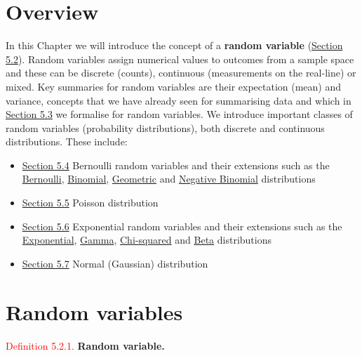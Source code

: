\documentclass[
]{book}
\providecommand{\tightlist}{%
  \setlength{\itemsep}{0pt}\setlength{\parskip}{0pt}}
\begin{document}
\hypertarget{rv:overview}{%
\section{Overview}\label{rv:overview}}

In this Chapter we will introduce the concept of a \textbf{random variable} (\protect\hyperlink{rv:des}{Section 5.2}). Random variables assign numerical values to outcomes from a sample space and these can be discrete (counts), continuous (measurements on the real-line) or mixed. Key summaries for random variables are their expectation (mean) and variance, concepts that we have already seen for summarising data and which in \protect\hyperlink{rv:expect}{Section 5.3} we formalise for random variables. We introduce important classes of random variables (probability distributions), both discrete and continuous distributions. These include:

\begin{itemize}
\tightlist
\item
  \protect\hyperlink{rv:Bernoulli}{Section 5.4} Bernoulli random variables and their extensions such as the \protect\hyperlink{rv:Bernoulli:bern}{Bernoulli}, \protect\hyperlink{rv:Bernoulli:bin}{Binomial}, \protect\hyperlink{rv:Bernoulli:geom}{Geometric} and \protect\hyperlink{rv:Bernoulli:negbin}{Negative Binomial} distributions\\
\item
  \protect\hyperlink{rv:Poisson}{Section 5.5} Poisson distribution\\
\item
  \protect\hyperlink{rv:exponential}{Section 5.6} Exponential random variables and their extensions such as the \protect\hyperlink{rv:exponential:exp}{Exponential}, \protect\hyperlink{rv:exponential:gamma}{Gamma}, \protect\hyperlink{rv:exponential:chi}{Chi-squared} and \protect\hyperlink{rv:exponential:beta}{Beta} distributions\\
\item
  \protect\hyperlink{rv:normal}{Section 5.7} Normal (Gaussian) distribution
\end{itemize}

\hypertarget{rv:des}{%
\section{Random variables}\label{rv:des}}

\leavevmode{}%
\textcolor{red}{Definition 5.2.1.}
{\textbf{Random variable.}}
\end{document}
